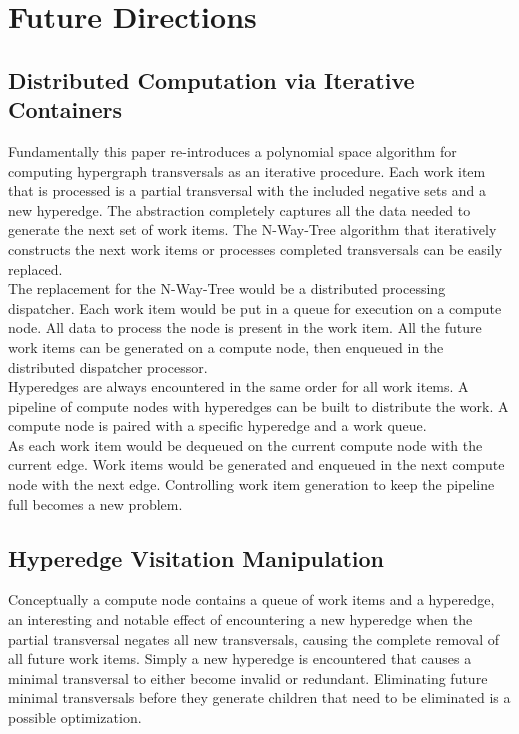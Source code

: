 \chapter{Future Directions}

\section{Distributed Computation via Iterative Containers}
Fundamentally this paper re-introduces a polynomial space algorithm for computing hypergraph transversals as an iterative procedure. Each work item that is processed is a partial transversal with the included negative sets and a new hyperedge. The abstraction completely captures all the data needed to generate the next set of work items. The N-Way-Tree algorithm that iteratively constructs the next work items or processes completed transversals can be easily replaced.\\

The replacement for the N-Way-Tree would be a distributed processing dispatcher. Each work item would be put in a queue for execution on a compute node. All data to process the node is present in the work item. All the future work items can be generated on a compute node, then enqueued in the distributed dispatcher processor. \\

Hyperedges are always encountered in the same order for all work items. A pipeline of compute nodes with hyperedges can be built to distribute the work. A compute node is paired with a specific hyperedge and a work queue.\\

As each work item would be dequeued on the current compute node with the current edge. Work items would be generated and enqueued in the next compute node with the next edge. Controlling work item generation to keep the pipeline full becomes a new problem.\\


\section{Hyperedge Visitation Manipulation}
Conceptually a compute node contains a queue of work items and a hyperedge, an interesting and notable effect of encountering a new hyperedge when the partial transversal negates all new transversals, causing the complete removal of all future work items. Simply a new hyperedge is encountered that causes a minimal transversal to either become invalid or redundant. Eliminating future minimal transversals before they generate children that need to be eliminated is a possible optimization. \\

